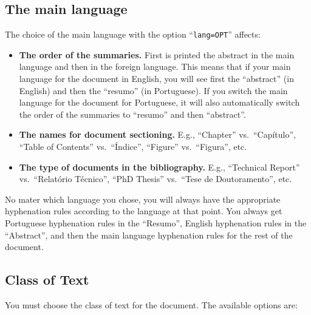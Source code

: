 \subsection{The main language}
\label{sub:the_main_language}

The choice of the main language with the option “\texttt{lang=OPT}” affects:

\begin{itemize}
  \item \textbf{The order of the summaries.} First is printed the abstract in the main language and then in the foreign language. This means that if your main language for the document in English, you will see first the “abstract” (in English) and then the “resumo” (in Portuguese). If you switch the main language for the document for Portuguese, it will also automatically switch the order of the summaries to “resumo” and then “abstract”.
  \item \textbf{The names for document sectioning.} E.g., ``Chapter'' vs.\ ``Capítulo'', ``Table of Contents'' vs.\ ``Índice'', ``Figure'' vs.\ ``Figura'', etc.
  \item \textbf{The type of documents in the bibliography.} E.g., ``Technical Report'' vs.\ ``Relatório Técnico'', ``PhD Thesis'' vs.\ ``Tese de Doutoramento'', etc.
\end{itemize}

No mater which language you chose, you will always have the appropriate hyphenation rules according to the language at that point. You always get Portuguese hyphenation rules in the ``Resumo'', English hyphenation rules in the ``Abstract'', and then the main language hyphenation rules for the rest of the document.




\subsection{Class of Text}
\label{sub:class_of_text}

You must choose the class of text for the document. The available options are:


